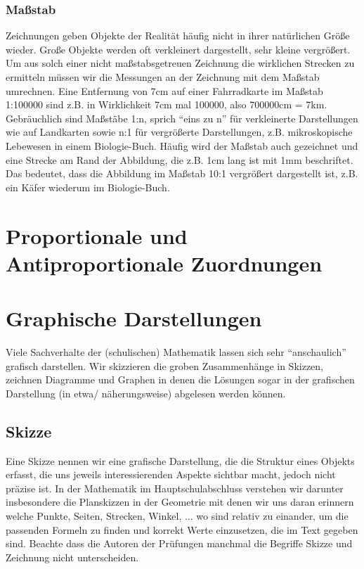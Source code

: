 \documentclass[a4paper]{book}%
\theoremstyle{definition}
\begin{document}
\subsection{Maßstab}\label{Maßstab}

Zeichnungen geben Objekte der Realität häufig nicht in ihrer natürlichen Größe wieder. Große Objekte werden oft verkleinert dargestellt, sehr kleine vergrößert. Um aus solch einer nicht maßstabsgetreuen Zeichnung die wirklichen Strecken zu ermitteln müssen wir die Messungen an der Zeichnung mit dem Maßstab umrechnen. Eine Entfernung von 7cm auf einer Fahrradkarte im Maßstab 1:100000 sind z.B. in Wirklichkeit 7cm mal 100000, also 700000cm = 7km. Gebräuchlich sind Maßstäbe 1:n, sprich \enquote{eins zu n} für verkleinerte Darstellungen wie auf Landkarten sowie n:1 für vergrößerte Darstellungen, z.B. mikroskopische Lebewesen in einem Biologie-Buch. Häufig wird der Maßstab auch gezeichnet und eine Strecke am Rand der Abbildung, die z.B. 1cm lang ist mit 1mm beschriftet. Das bedeutet, dass die Abbildung im Maßstab 10:1 vergrößert dargestellt ist, z.B. ein Käfer wiederum im Biologie-Buch.


\chapter{Proportionale und Antiproportionale Zuordnungen}


\chapter{Graphische Darstellungen}

Viele Sachverhalte der (schulischen) Mathematik lassen sich sehr \enquote{anschaulich} grafisch darstellen. Wir skizzieren die groben Zusammenhänge in Skizzen, zeichnen Diagramme und Graphen in denen die Lösungen sogar in der grafischen Darstellung (in etwa/ näherungsweise) abgelesen werden können.


\section{Skizze}

Eine Skizze nennen wir eine grafische Darstellung, die die Struktur eines Objekts erfasst, die uns jeweils interessierenden Aspekte sichtbar macht, jedoch nicht präzise ist. In der Mathematik im Hauptschulabschluss verstehen wir darunter insbesondere die Planskizzen in der Geometrie mit denen wir uns daran erinnern welche Punkte, Seiten, Strecken, Winkel, ... wo sind relativ zu einander, um die passenden Formeln zu finden und korrekt Werte einzusetzen, die im Text gegeben sind. Beachte dass die Autoren der Prüfungen manchmal die Begriffe Skizze und Zeichnung nicht unterscheiden.
\end{document}

